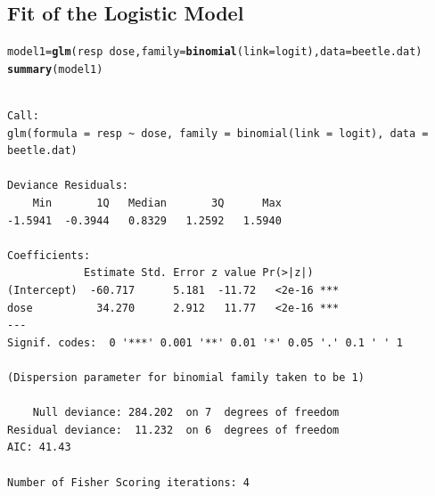 \documentclass{article}\usepackage[]{graphicx}\usepackage[svgnames]{xcolor}
\makeatletter
\newcommand{\hlopt}[1]{\textcolor[rgb]{0,0,0}{#1}}%
\newcommand{\hlstd}[1]{\textcolor[rgb]{0.345,0.345,0.345}{#1}}%
\newcommand{\hlkwb}[1]{\textcolor[rgb]{0.69,0.353,0.396}{#1}}%
\newcommand{\hlkwc}[1]{\textcolor[rgb]{0.333,0.667,0.333}{#1}}%
\newcommand{\hlkwd}[1]{\textcolor[rgb]{0.737,0.353,0.396}{\textbf{#1}}}%
\newenvironment{kframe}{%
 \def\at@end@of@kframe{}%
 \ifinner\ifhmode%
  \def\at@end@of@kframe{\end{minipage}}%
  \begin{minipage}{\columnwidth}%
 \fi\fi%
 \def\FrameCommand##1{\hskip\@totalleftmargin \hskip-\fboxsep
 \colorbox{shadecolor}{##1}\hskip-\fboxsep
     \hskip-\linewidth \hskip-\@totalleftmargin \hskip\columnwidth}%
 \MakeFramed {\advance\hsize-\width
   \@totalleftmargin\z@ \linewidth\hsize
   \@setminipage}}%
 {\par\unskip\endMakeFramed%
 \at@end@of@kframe}
\newenvironment{knitrout}{}{} %
\makeatother
\begin{document}
\subsection*{Fit of the Logistic Model}
\begin{knitrout}
\color{fgcolor}\begin{kframe}
\begin{alltt}
\hlstd{model1} \hlkwb{=} \hlkwd{glm}\hlstd{(resp} \hlopt{~} \hlstd{dose,} \hlkwc{family} \hlstd{=} \hlkwd{binomial}\hlstd{(}\hlkwc{link} \hlstd{= logit),} \hlkwc{data} \hlstd{= beetle.dat)}
\hlkwd{summary}\hlstd{(model1)}
\end{alltt}
\begin{verbatim}

Call:
glm(formula = resp ~ dose, family = binomial(link = logit), data = beetle.dat)

Deviance Residuals: 
    Min       1Q   Median       3Q      Max  
-1.5941  -0.3944   0.8329   1.2592   1.5940  

Coefficients:
            Estimate Std. Error z value Pr(>|z|)    
(Intercept)  -60.717      5.181  -11.72   <2e-16 ***
dose          34.270      2.912   11.77   <2e-16 ***
---
Signif. codes:  0 '***' 0.001 '**' 0.01 '*' 0.05 '.' 0.1 ' ' 1

(Dispersion parameter for binomial family taken to be 1)

    Null deviance: 284.202  on 7  degrees of freedom
Residual deviance:  11.232  on 6  degrees of freedom
AIC: 41.43

Number of Fisher Scoring iterations: 4
\end{verbatim}
\end{kframe}
\end{knitrout}
\end{document}
